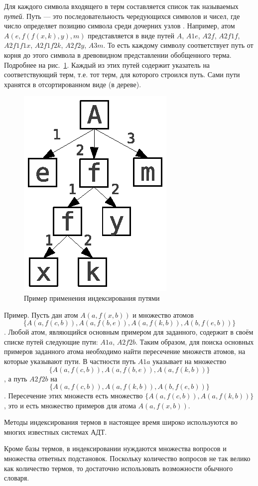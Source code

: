 Для каждого символа входящего в терм составляется список так называемых \emph{путей}. Путь --- это последовательность чередующихся символов и чисел, где число определяет позицию символа среди дочерних узлов \cite{disctree}. Например, атом $A(e,f(f(x,k),y),m)$ представляется в виде путей $A$, $A1e$, $A2f$, $A2f1f$, $A2f1f1x$, $A2f1f2k$, $A2f2y$, $A3m$. То есть каждому символу соответствует путь от корня до этого символа в древовидном представлении обобщенного терма. Подробнее на рис.~\ref{pathfig}. Каждый из этих путей содержит указатель на соответствующий терм, т.е. тот терм, для которого строился путь. Сами пути хранятся в отсортированном виде (в дереве).
\begin{figure}[h]
	\centering
	\includegraphics[width=0.2\linewidth]{pics/Path1.eps}
	\caption{Пример применения индексирования путями}
	\label{pathfig}
\end{figure}

Пример. Пусть дан атом $A(a,f(x,b))$ и множество атомов
$$\{A(a,f(c,b)), A(a,f(b,e)),A(a,f(k,b)), A(b,f(e,b))\}$$.
Любой атом, являющийся основным примером для заданного, содержит в своём списке путей следующие пути: $A1a$, $A2f2b$. Таким образом, для поиска основных примеров заданного атома необходимо найти пересечение множеств атомов, на которые указывают пути.  В частности путь $A1a$ указывает на множество
$$\{A(a,f(c,b)), A(a,f(b,e)),A(a,f(k,b))\}$$,
а путь $A2f2b$ на
$$\{A(a,f(c,b)), A(a,f(k,b)), A(b,f(e,b))\}$$.
Пересечение этих множеств есть множество $\{A(a,f(c,b)),A(a,f(k,b))\}$, это и есть множество примеров для атома $A(a,f(x,b))$.

Методы индексирования термов в настоящее время широко используются во многих известных системах АДТ. %

Кроме базы термов, в индексировании нуждаются множества вопросов и множества ответных подстановок. Поскольку количество вопросов не так велико как количество термов, то достаточно использовать возможности обычного словаря.

